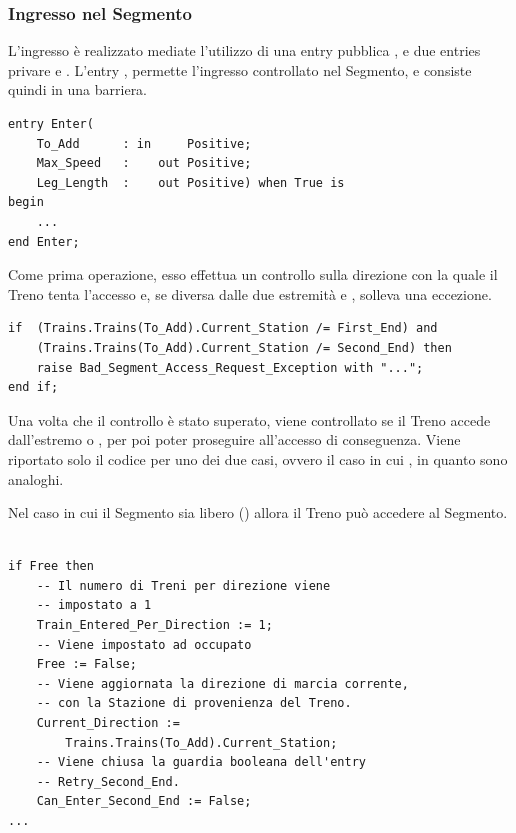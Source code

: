 	\subsubsection{Ingresso nel Segmento}
	
	L'ingresso è realizzato mediate l'utilizzo di una entry pubblica , e due entries privare  e .	
	L'entry , permette l'ingresso controllato nel Segmento, e consiste quindi in una barriera.

\begin{lstlisting}
entry Enter(
	To_Add      : in     Positive;
	Max_Speed   : 	 out Positive;
	Leg_Length  :    out Positive) when True is
begin
	...
end Enter;
\end{lstlisting}

	Come prima operazione, esso effettua un controllo sulla direzione con la quale il Treno tenta l'accesso e, se diversa dalle due estremità  e , solleva una eccezione.

\begin{lstlisting}
if  (Trains.Trains(To_Add).Current_Station /= First_End) and 
    (Trains.Trains(To_Add).Current_Station /= Second_End) then
	raise Bad_Segment_Access_Request_Exception with "...";
end if;
\end{lstlisting}

Una volta che il controllo è stato superato, viene controllato se il Treno accede dall'estremo  o , per poi poter proseguire all'accesso di conseguenza. Viene riportato solo il codice per uno dei due casi, ovvero il caso in cui , in quanto sono analoghi.

Nel caso in cui il Segmento sia libero () allora il Treno può accedere al Segmento.

\begin{lstlisting}

if Free then
	-- Il numero di Treni per direzione viene 
	-- impostato a 1
	Train_Entered_Per_Direction := 1;
	-- Viene impostato ad occupato
	Free := False;
	-- Viene aggiornata la direzione di marcia corrente,
	-- con la Stazione di provenienza del Treno.
	Current_Direction := 
		Trains.Trains(To_Add).Current_Station;
	-- Viene chiusa la guardia booleana dell'entry 
	-- Retry_Second_End. 
	Can_Enter_Second_End := False;
...

\end{lstlisting}

